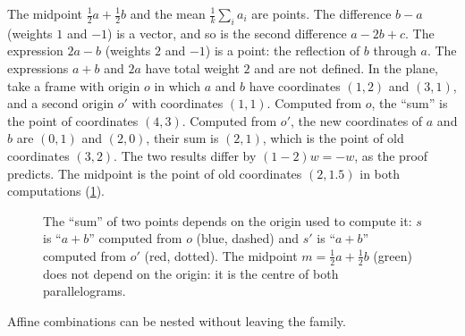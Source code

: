 \begin{notechapter}
\begin{example}
\label{affine-spaces:ex:midpoint}
The midpoint $\frac12a + \frac12b$ and the mean $\frac1k\sum_ia_i$ are
points. The difference $b - a$ (weights $1$ and $-1$) is a vector, and so
is the second difference $a - 2b + c$. The expression $2a - b$ (weights $2$
and $-1$) is a point: the reflection of $b$ through $a$. The expressions
$a + b$ and $2a$ have total weight $2$ and are not defined. In the plane,
take a frame with origin $o$ in which $a$ and $b$ have coordinates $(1, 2)$
and $(3, 1)$, and a second origin $o'$ with coordinates $(1, 1)$. Computed
from $o$, the ``sum'' is the point of coordinates $(4, 3)$. Computed from
$o'$, the new coordinates of $a$ and $b$ are $(0, 1)$ and $(2, 0)$, their
sum is $(2, 1)$, which is the point of old coordinates $(3, 2)$. The two
results differ by $(1 - 2)w = -w$, as the proof predicts. The midpoint is
the point of old coordinates $(2, 1.5)$ in both computations
(\cref{affine-spaces:fig:sum-midpoint}).
\end{example}

\begin{figure}[ht]
\centering
{}
\caption{The ``sum'' of two points depends on the origin used to compute it:
$s$ is ``$a + b$'' computed from $o$ (blue, dashed) and $s'$ is
``$a + b$'' computed from $o'$ (red, dotted). The midpoint
$m = \frac12a + \frac12b$ (green) does not depend on the origin: it is the
centre of both parallelograms.}
\label{affine-spaces:fig:sum-midpoint}
\end{figure}

Affine combinations can be nested without leaving the family.


\end{notechapter}
